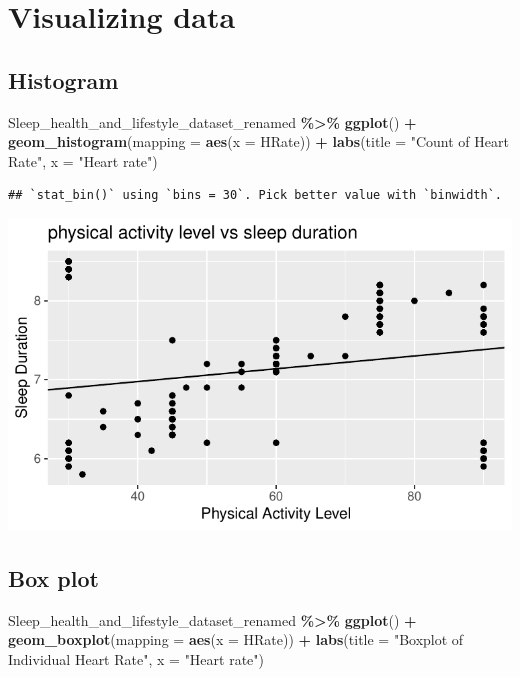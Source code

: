 \documentclass[
  11pt,
]{article}
\newenvironment{Shaded}{\begin{snugshade}}{\end{snugshade}}
\newcommand{\AttributeTok}[1]{\textcolor[rgb]{0.13,0.29,0.53}{#1}}
\newcommand{\FunctionTok}[1]{\textcolor[rgb]{0.13,0.29,0.53}{\textbf{#1}}}
\newcommand{\NormalTok}[1]{#1}
\newcommand{\SpecialCharTok}[1]{\textcolor[rgb]{0.81,0.36,0.00}{\textbf{#1}}}
\newcommand{\StringTok}[1]{\textcolor[rgb]{0.31,0.60,0.02}{#1}}
\begin{document}
\hypertarget{visualizing-data}{%
\section{Visualizing data}\label{visualizing-data}}

\hypertarget{histogram}{%
\subsection{Histogram}\label{histogram}}

\begin{Shaded}
\begin{Highlighting}[]
\NormalTok{Sleep\_health\_and\_lifestyle\_dataset\_renamed }\SpecialCharTok{\%\textgreater{}\%}
  \FunctionTok{ggplot}\NormalTok{() }\SpecialCharTok{+}
    \FunctionTok{geom\_histogram}\NormalTok{(}\AttributeTok{mapping =} \FunctionTok{aes}\NormalTok{(}\AttributeTok{x =}\NormalTok{ HRate)) }\SpecialCharTok{+}
    \FunctionTok{labs}\NormalTok{(}\AttributeTok{title =} \StringTok{"Count of Heart Rate"}\NormalTok{, }\AttributeTok{x =} \StringTok{"Heart rate"}\NormalTok{)}
\end{Highlighting}
\end{Shaded}

\begin{verbatim}
## `stat_bin()` using `bins = 30`. Pick better value with `binwidth`.
\end{verbatim}

\begin{center}\includegraphics[width=0.7\linewidth]{SleepHelath_files/figure-latex/unnamed-chunk-22-1} \end{center}

\hypertarget{box-plot}{%
\subsection{Box plot}\label{box-plot}}

\begin{Shaded}
\begin{Highlighting}[]
\NormalTok{Sleep\_health\_and\_lifestyle\_dataset\_renamed }\SpecialCharTok{\%\textgreater{}\%}
  \FunctionTok{ggplot}\NormalTok{() }\SpecialCharTok{+}
    \FunctionTok{geom\_boxplot}\NormalTok{(}\AttributeTok{mapping =} \FunctionTok{aes}\NormalTok{(}\AttributeTok{x =}\NormalTok{ HRate)) }\SpecialCharTok{+}
    \FunctionTok{labs}\NormalTok{(}\AttributeTok{title =} \StringTok{"Boxplot of Individual Heart Rate"}\NormalTok{, }\AttributeTok{x =} \StringTok{"Heart rate"}\NormalTok{)}
\end{Highlighting}
\end{Shaded}
\end{document}
